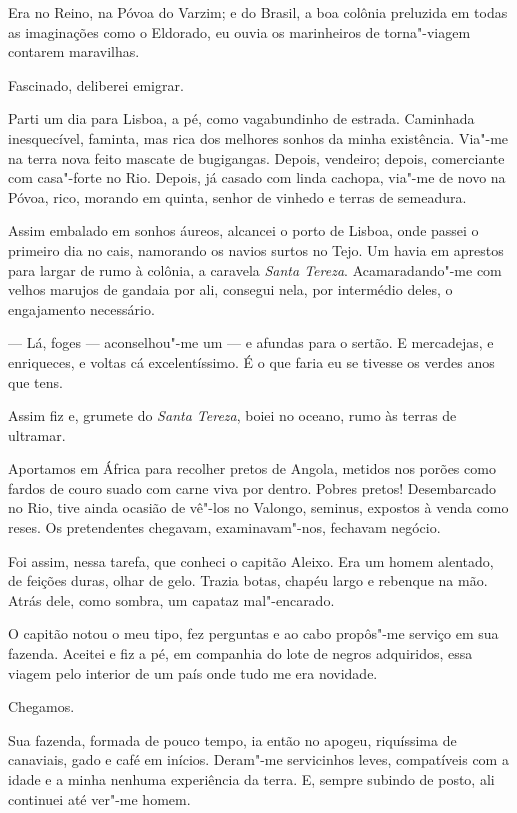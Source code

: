 Era no Reino, na Póvoa do Varzim; e do Brasil, a boa colônia preluzida
em todas as imaginações como o Eldorado, eu ouvia os marinheiros de
torna"-viagem contarem maravilhas.

Fascinado, deliberei emigrar.

Parti um dia para Lisboa, a pé, como vagabundinho de estrada. Caminhada
inesquecível, faminta, mas rica dos melhores sonhos da minha existência.
Via"-me na terra nova feito mascate de bugigangas. Depois, vendeiro;
depois, comerciante com casa"-forte no Rio. Depois, já casado com linda
cachopa, via"-me de novo na Póvoa, rico, morando em quinta, senhor de
vinhedo e terras de semeadura.

Assim embalado em sonhos áureos, alcancei o porto de Lisboa, onde passei
o primeiro dia no cais, namorando os navios surtos no Tejo. Um havia em
aprestos para largar de rumo à colônia, a caravela \emph{Santa Tereza}.
Acamaradando"-me com velhos marujos de gandaia por ali, consegui nela,
por intermédio deles, o engajamento necessário.

--- Lá, foges --- aconselhou"-me um --- e afundas para o sertão. E
mercadejas, e enriqueces, e voltas cá excelentíssimo. É o que faria eu
se tivesse os verdes anos que tens.

Assim fiz e, grumete do \emph{Santa Tereza}, boiei no oceano, rumo às
terras de ultramar.

Aportamos em África para recolher pretos de Angola, metidos nos porões
como fardos de couro suado com carne viva por dentro. Pobres pretos!
Desembarcado no Rio, tive ainda ocasião de vê"-los no Valongo, seminus,
expostos à venda como reses. Os pretendentes chegavam, examinavam"-nos,
fechavam negócio.

Foi assim, nessa tarefa, que conheci o capitão Aleixo. Era um homem
alentado, de feições duras, olhar de gelo. Trazia botas, chapéu largo e
rebenque na mão. Atrás dele, como sombra, um capataz mal"-encarado.

O capitão notou o meu tipo, fez perguntas e ao cabo propôs"-me serviço em
sua fazenda. Aceitei e fiz a pé, em companhia do lote de negros
adquiridos, essa viagem pelo interior de um país onde tudo me era
novidade.

Chegamos.

Sua fazenda, formada de pouco tempo, ia então no apogeu, riquíssima de
canaviais, gado e café em inícios. Deram"-me servicinhos leves,
compatíveis com a idade e a minha nenhuma experiência da terra. E,
sempre subindo de posto, ali continuei até ver"-me homem.

